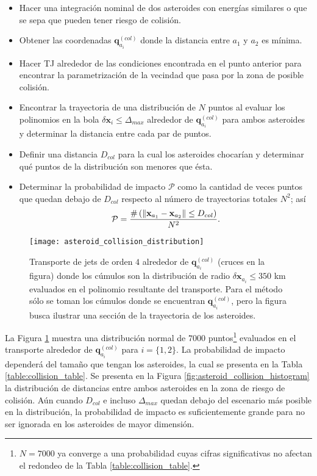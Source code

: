 \begin{itemize}
 \item Hacer una integración nominal de dos asteroides con energías similares o que se sepa que pueden tener riesgo de colisión.
 
 \item Obtener las coordenadas $\mathbf{q}_{a_i}^{(col)}$ donde la distancia entre $a_1$ y $a_2$ es mínima.
 
 \item Hacer TJ alrededor de las condiciones encontrada en el punto anterior para encontrar la parametrización de la vecindad que pasa por la zona de posible colisión.
 
 \item Encontrar la trayectoria de una distribución de $N$ puntos al evaluar los polinomios en la bola $\delta\mathbf{x}_i \leq \Delta_{max}$ alrededor de $\mathbf{q}_{a_i}^{(col)}$ para ambos asteroides y determinar la distancia entre cada par de puntos.
 
 \item Definir una distancia $D_{col}$ para la cual los asteroides chocarían y determinar qué puntos de la distribución son menores que ésta.
 
 \item Determinar la probabilidad de impacto $\mathcal{P}$ como la cantidad de veces puntos que quedan debajo de $D_{col}$ respecto al número de trayectorias totales $N^2$; así
 \begin{equation} 
 \mathcal{P} = \frac{ \# \left( \left\lVert\mathbf{x}_{a_1} - \mathbf{x}_{a_2} \right\rVert    \leq D_{col} \right) }{N^2}.
 \end{equation}
\end{itemize}

\begin{figure}
 \centering
 \texttt{[image: asteroid\_collision\_distribution]}
 \caption{Transporte de jets de orden $4$ alrededor de $\mathbf{q}_{a_i}^{(col)}$ (cruces en la figura) donde los cúmulos son la distribución de radio $\delta\mathbf{x}_{a_i} \leq 350$ km evaluados en el polinomio resultante del transporte. Para el método sólo se toman los cúmulos donde se encuentran $\mathbf{q}_{a_i}^{(col)}$, pero la figura busca ilustrar una sección de la trayectoria de los asteroides.}
 \label{fig:asteroid_collision_distribution}
\end{figure}

La Figura \ref{fig:asteroid_collision_distribution} muestra una distribución normal de $7000$ puntos\footnote{$ N = 7000$ ya converge a una probabilidad cuyas cifras significativas no afectan el redondeo de la Tabla \ref{table:collision_table}.} evaluados en el transporte alrededor de $\mathbf{q}_{a_i}^{(col)}$ para $i = \{1,2\}$. La probabilidad de impacto dependerá del tamaño que tengan los asteroides, la cual se presenta en la Tabla \ref{table:collision_table}. Se presenta en la Figura \ref{fig:asteroid_collision_histogram} la distribución de distancias entre ambos asteroides en la zona de riesgo de colisión. Aún cuando $D_{col}$ e incluso $\Delta_{max}$ quedan debajo del escenario más posible en la distribución, la probabilidad de impacto es suficientemente grande para no ser ignorada en los asteroides de mayor dimensión.

